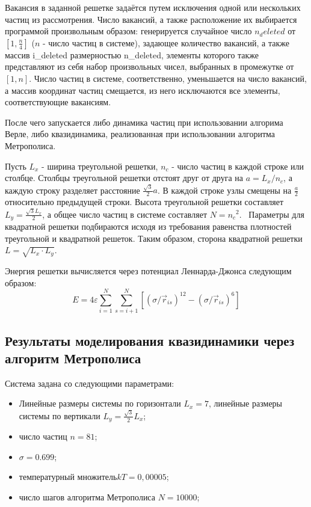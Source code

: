 \documentclass[14pt,a4paper,report]{ncc}
\begin{document}
Вакансия в заданной решетке задаётся путем исключения одной или нескольких частиц из рассмотрения. Число вакансий, а также расположение их выбирается программой произвольным образом: генерируется случайное число $n_deleted$ от $[1, \frac{n}{4}]$ ($n$ - число частиц в системе), задающее количество вакансий, а также массив i_deleted размерностью n_deleted, элементы которого также представляют из себя набор произвольных чисел, выбранных в промежутке от $[1, n]$. Число частиц в системе, соответственно, уменьшается на число вакансий, а массив координат частиц смещается, из него исключаются все элементы, соответствующие вакансиям.
\

После чего запускается либо динамика частиц при использовании алгорима Верле, либо квазидинамика, реализованная при использовании алгоритма Метрополиса.

Пусть $L_x$ - ширина треугольной решетки, $n_c$ - число частиц в каждой строке или столбце. Столбцы треугольной решетки отстоят друг от друга на $a={L_x}/{n_c}$, а каждую строку разделяет расстояние $\frac{\sqrt{3}}{2} a$. В каждой строке узлы смещены на $\frac{a}{2}$ относительно предыдущей строки. Высота треугольной решетки составляет $L_y=\frac{\sqrt{3}L_x}{2}$, а общее число частиц в системе составляет $N={n_c}^2$. 
\
Параметры для квадратной решетки подбираются исходя из требования равенства плотностей  треугольной и квадратной решеток. Таким образом, сторона квадратной решетки $L=\sqrt{L_x \cdot L_y}$.
\

Энергия решетки вычисляется через потенциал Леннарда-Джонса следующим образом:
\begin{equation}
E=4 \varepsilon \sum\limits_{i=1}^N \sum\limits_{s=i+1}^N{ [(\sigma/\vec{r}_{is})^{12} - (\sigma/\vec{r}_{is})^{6}  ]}
\end{equation}
\subsection{Результаты моделирования квазидинамики через алгоритм Метрополиса}
Система задана со следующими параметрами:
\begin{itemize}
\item Линейные размеры системы по горизонтали $L_x=7$, линейные размеры системы по вертикали $L_y=\frac{\sqrt{3}}{2}L_x$;
\item число частиц $n=81$;
\item $\sigma=0.699$;
\item температурный множитель$kT=0,00005$;
\item число шагов алгоритма Метрополиса $N=10000$;
\end{itemize}
\end{document}
